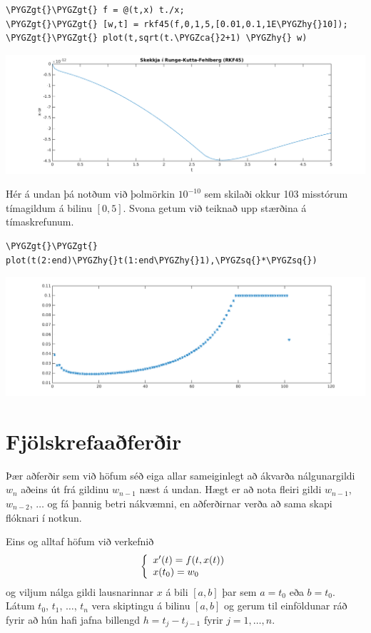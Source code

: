 \documentclass[letterpaper,10pt,icelandic]{sphinxmanual}
\def\PYGZca{\char`\^}
\def\PYGZgt{\char`\>}
\def\PYGZhy{\char`\-}
\def\PYGZsq{\char`\'}
\renewcommand\PYGZsq{\textquotesingle}
\begin{document}
\begin{Verbatim}[commandchars=\\\{\}]
\PYGZgt{}\PYGZgt{} f = @(t,x) t./x;
\PYGZgt{}\PYGZgt{} [w,t] = rkf45(f,0,1,5,[0.01,0.1,1E\PYGZhy{}10]);
\PYGZgt{}\PYGZgt{} plot(t,sqrt(t.\PYGZca{}2+1) \PYGZhy{} w)
\end{Verbatim}

\includegraphics{7rkf45.png}

Hér á undan þá notðum við þolmörkin \(10^{-10}\) sem skilaði okkur
103 misstórum tímagildum á bilinu \([0,5]\). Svona getum við teiknað
upp stærðina á tímaskrefunum.

\begin{Verbatim}[commandchars=\\\{\}]
\PYGZgt{}\PYGZgt{} plot(t(2:end)\PYGZhy{}t(1:end\PYGZhy{}1),\PYGZsq{}*\PYGZsq{})
\end{Verbatim}

\includegraphics{7rkf45t.png}


\section{Fjölskrefaaðferðir}
\label{kafli06:index-16}\label{kafli06:fjolskrefaaferir}
Þær aðferðir sem við höfum séð eiga allar sameiginlegt að ákvarða
nálgunargildi \(w_{n}\) aðeins út frá gildinu \(w_{n-1}\) næst á
undan. Hægt er að nota fleiri gildi \(w_{n-1}\), \(w_{n-2}\),
\(\ldots\) og fá þannig betri nákvæmni, en aðferðirnar verða að sama
skapi flóknari í notkun.

Eins og alltaf höfum við verkefnið
\begin{gather}
\begin{split}\left\{
    \begin{array}{l}
      x'(t) = f(t,x(t)) \\
      x(t_0) = w_0
    \end{array}
  \right.\end{split}\notag
\end{gather}
og viljum nálga gildi lausnarinnar \(x\) á bili \([a,b]\) þar
sem \(a =t_0\) eða \(b = t_0\). Látum \(t_0\), \(t_1\),
\(\ldots\), \(t_n\) vera skiptingu á bilinu \([a,b]\) og
gerum til einföldunar ráð fyrir að hún hafi jafna billengd
\(h=t_{j} - t_{j-1}\) fyrir \(j= 1, \ldots, n\).
\end{document}
